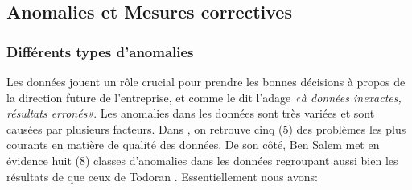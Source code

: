 \subsection{Anomalies et Mesures correctives}
\subsubsection{\textbf{Diff\'erents types d'anomalies}}

Les données jouent un r\^ole crucial pour prendre les bonnes décisions à propos de la direction future de l’entreprise, et comme le dit l'adage \textit{«\`a données inexactes, résultats erronés»}. Les anomalies dans les données sont très variées et sont causées par plusieurs facteurs. Dans \cite{IFP}, on retrouve cinq (5) des probl\`emes les plus courants en mati\`ere de qualit\'e des donn\'ees. De son c\^ot\'e, Ben Salem \cite{bensalem}  met en évidence huit (8) classes d'anomalies dans les donn\'ees regroupant aussi bien les r\'esultats de \cite{IFP} que ceux de Todoran \cite{todoran}. Essentiellement nous avons: 

